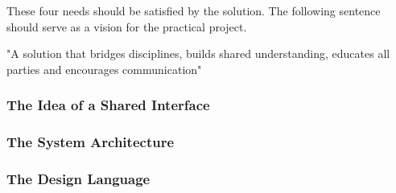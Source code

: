 These four needs should be satisfied by the solution. The following sentence should serve as a
vision for the practical project.

"A solution that bridges disciplines, builds shared understanding, educates all parties and
encourages communication"

\subsubsection{The Idea of a Shared Interface}


\subsubsection{The System Architecture}
% 
        
%




\subsubsection{The Design Language}

